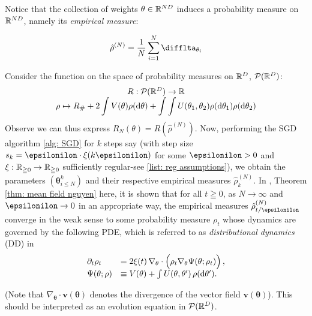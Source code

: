 \documentclass{article}
\begin{document}
Notice that the collection of weights $  \mathbf{\theta}\in \mathbb{R}^{ND}$ induces a probability measure on $ \mathbb{R}^{ND}$, namely its \textit{empirical measure}:

\begin{equation}\label{eq: empirical measure}
	\hat{\rho}^{(N)} = \frac{1}{N}\displaystyle\sum^{N}_{i=1}\difflta_{ \mathbf{\theta}_{i}} 
\end{equation}

Consider the function on the space of probability measures on $ \mathbb{R}^{D}$, $  \mathcal{P}(\mathbb{R}^{D})$:
\[
\begin{array}{cc}
    R: \mathcal{P}(\mathbb{R}^{D})\to \mathbb{R} \\ 
    \rho \mapsto R_{\#}+ 2 \displaystyle\int V( \mathbf{\theta}) \rho( \operatorname{d}\! \mathbf{\theta}) + \displaystyle \int\int U( \mathbf{\theta}_{1}, \mathbf{\theta}_{2}) \rho( \operatorname{d}\! \mathbf{\theta}_{1}) \rho( \operatorname{d}\! \mathbf{\theta}_{2})   
\end{array}
\]
Observe we can thus express $ R_{N}(\mathbb{\theta}) = R(\hat{\rho}^{(N)})$. Now, performing the SGD algorithm \ref{alg: SGD} for $ k$ steps say (with step size $ s_k = \epsilonilon\cdot \xi(k \epsilonilon)$ for some $ \epsilonilon >0$ and $ \xi: \mathbb{R}_{\geqq 0}\to \mathbb{R}_{\geqq 0}$ sufficiently regular-see \ref{list: reg assumptions}), we obtain the parameters $  (\mathbf{\theta}^{k}_{i\leq N})$ and their respective empirical measures $ \hat{\rho}^{(N)}_k$. In \cite{Mei_2018}, Theorem \ref{thm: mean field nguyen} here, it is shown that for all $ t\geqq 0$, as $ N\to \infty$ and $ \epsilonilon \to 0$ in an appropriate way, the empirical measures $ \hat{\rho}^{(N)}_{t/\epsilonilon}$ converge in the weak sense to some probability measure $ \rho_t$ whose dynamics are governed by the following PDE, which is referred to as \emph{distributional dynamics} (DD) in \cite{Mei_2018}
\begin{equation}
	\begin{array}{ll}
\partial_t \rho_t & =2\xi(t)\, \nabla_{ \mathbf{\theta}}\cdot \Big(\rho_t \nabla_{ \mathbf{\theta}}\Psi( \mathbf{\theta};\rho_t)\Big)\, ,\label{eq:GeneralPDE}\\
\Psi( \mathbf{\theta};\rho) & \equiv V( \mathbf{ \theta})+\int U( \mathbf{\theta}, \mathbf{\theta}')\, \rho(\operatorname{d}\!  \mathbf{\theta}') .
\end{array}
\end{equation}

(Note that $\nabla_{ \mathbf{\theta}}\cdot \mathbf{v}( \mathbf{\theta})$ denotes the divergence of the vector field $ \mathbf{v}( \mathbf{\theta})$). This should  be interpreted as an evolution equation in $ \mathcal{P}(\mathbb{R}^D)$.\\
\end{document}

